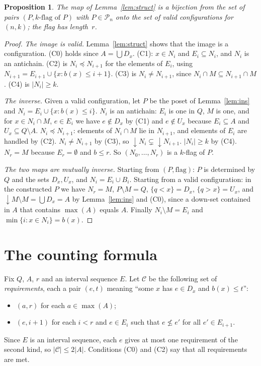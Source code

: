 \documentclass[11pt]{article}
\newtheorem{proposition}[theorem]{Proposition}
\theoremstyle{definition}
\theoremstyle{remark}
\newcommand{\dn}{{\downarrow}}
\newcommand{\cP}{\mathcal{P}}
\newcommand{\cC}{\mathcal{C}}
\begin{document}
\begin{proposition}\label{prop:bij}
The map of Lemma~\ref{lem:struct} is a bijection from the set of pairs
$(P,\text{$k$-flag of }P)$ with $P\in\cP_n$ onto the set of valid configurations for
$(n,k)$; the flag has length~$r$.
\end{proposition}
\begin{proof}
\emph{The image is valid.} Lemma~\ref{lem:struct} shows that the image is a configuration.
(C0) holds since $A=\bigcup D_x$. (C1): $x\in N_i$ and $E_i\subseteq N_i$, and $N_i$ is an
antichain. (C2) is $N_i\preceq N_{i+1}$ for the elements of $E_i$, using
$N_{i+1}=E_{i+1}\cup\{x:b(x)\le i+1\}$. (C3) is $N_i\ne N_{i+1}$, since
$N_i\cap M\subseteq N_{i+1}\cap M$. (C4) is $|N_i|\ge k$.

\emph{The inverse.} Given a valid configuration, let $P$ be the poset of
Lemma~\ref{lem:ins} and $N_i=E_i\cup\{x:b(x)\le i\}$. $N_i$ is an antichain: $E_i$ is one
in $Q$, $M$ is one, and for $x\in N_i\cap M$, $e\in E_i$ we have $e\notin D_x$ by (C1) and
$e\notin U_x$ because $E_i\subseteq A$ and $U_x\subseteq Q\setminus A$.
$N_i\preceq N_{i+1}$: elements of $N_i\cap M$ lie in $N_{i+1}$, and elements of $E_i$ are
handled by (C2). $N_i\ne N_{i+1}$ by (C3), so $\dn N_i\subsetneq\dn N_{i+1}$.
$|N_i|\ge k$ by (C4). $N_r=M$ because $E_r=\emptyset$ and $b\le r$. So $(N_0,\dots,N_r)$
is a $k$-flag of $P$.

\emph{The two maps are mutually inverse.} Starting from $(P,\text{flag})$: $P$ is
determined by $Q$ and the sets $D_x,U_x$, and $N_i=E_i\cup B_i$. Starting from a valid
configuration: in the constructed $P$ we have $N_r=M$, $P\setminus M=Q$,
$\{q<x\}=D_x$, $\{q>x\}=U_x$, and $\dn M\setminus M=\bigcup D_x=A$ by
Lemma~\ref{lem:ins} and (C0), since a down-set contained in $A$ that contains
$\max(A)$ equals $A$. Finally $N_i\setminus M=E_i$ and $\min\{i:x\in N_i\}=b(x)$.
\end{proof}

\section{The counting formula}

Fix $Q$, $A$, $r$ and an interval sequence $E$. Let $\cC$ be the following set of
\emph{requirements}, each a pair $(e,t)$ meaning ``some $x$ has $e\in D_x$ and
$b(x)\le t$'':
\begin{itemize}
\item $(a,r)$ for each $a\in\max(A)$;
\item $(e,i+1)$ for each $i<r$ and $e\in E_i$ such that $e\not\le e'$ for all
      $e'\in E_{i+1}$.
\end{itemize}
Since $E$ is an interval sequence, each $e$ gives at most one requirement of the second
kind, so $|\cC|\le 2|A|$. Conditions (C0) and (C2) say that all requirements are met.
\end{document}
